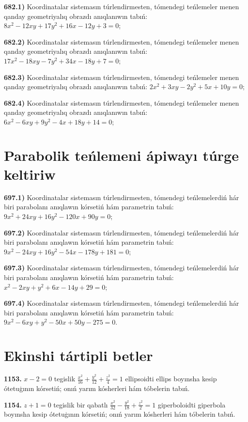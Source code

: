 \textbf{682.1)} Koordinatalar sistemasın túrlendirmesten, tómendegi teńlemeler menen qanday geometriyalıq obrazdı anıqlanıwın tabıń: $8 x^2-12 x y+17 y^2+16 x-12 y+3=0$;

\textbf{682.2)} Koordinatalar sistemasın túrlendirmesten, tómendegi teńlemeler menen qanday geometriyalıq obrazdı anıqlanıwın tabıń: $17 x^2-18 x y-7 y^2+34 x-18 y+7=0$;

\textbf{682.3)} Koordinatalar sistemasın túrlendirmesten, tómendegi teńlemeler menen qanday geometriyalıq obrazdı anıqlanıwın tabıń: $2 x^2+3 x y-2 y^2+5 x+10 y=0$;

\textbf{682.4)} Koordinatalar sistemasın túrlendirmesten, tómendegi teńlemeler menen qanday geometriyalıq obrazdı anıqlanıwın tabıń: $6 x^2-6 x y+9 y^2-4 x+18 y+14=0$;



\section{Parabolik teńlemeni ápiwayı túrge keltiriw}



\textbf{697.1) } Koordinatalar sistemasın túrlendirmesten, tómendegi teńlemelerdiń hár biri parabolanı anıqlawın kórsetiń hám parametrin tabıń: $9 x^2+24 x y+16 y^2-120 x+90 y=0$;

\textbf{697.2)} Koordinatalar sistemasın túrlendirmesten, tómendegi teńlemelerdiń hár biri parabolanı anıqlawın kórsetiń hám parametrin tabıń: $9 x^2-24 x y+16 y^2-54 x-178 y+181=0$;

\textbf{697.3)} Koordinatalar sistemasın túrlendirmesten, tómendegi teńlemelerdiń hár biri parabolanı anıqlawın kórsetiń hám parametrin tabıń: $x^2-2 x y+y^2+6 x-14 y+29=0$;

\textbf{697.4)} Koordinatalar sistemasın túrlendirmesten, tómendegi teńlemelerdiń hár biri parabolanı anıqlawın kórsetiń hám parametrin tabıń: $9 x^2-6 x y+y^2-50 x+50 y-275=0$.



\section{Ekinshi tártipli betler}



\textbf{1153.} $x-2=0$ tegislik $\frac{x^2}{16}+\frac{y^2}{12}+\frac{z^2}{4}=1$ ellipsoidti ellips boyınsha kesip ótetuģının kórsetiń; onıń yarım kósherleri hám tóbelerin tabıń.

\textbf{1154.} $z+1=0$ tegislik bir qabatlı $\frac{x^2}{32}-\frac{y^2}{18}+\frac{z^2}{2}=1$ giperboloidti giperbola boyınsha kesip ótetuģının kórsetiń; onıń yarım kósherleri hám tóbelerin tabıń.

